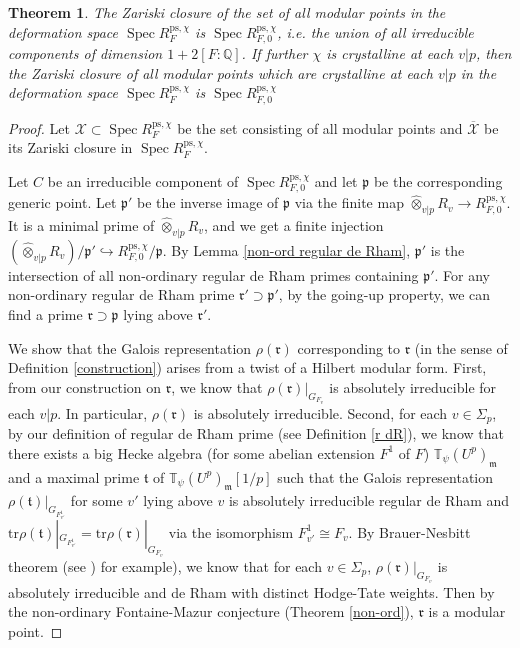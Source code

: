\documentclass[a4paper, 12pt]{amsart}
\newtheorem{thm}{Theorem}[subsection]
\DeclareMathOperator{\Spec}{Spec}
\def\ps{\mathrm{ps}}
\newcommand{\Q}{\mathbb{Q}}
\newcommand{\T}{\mathbb{T}}
\newcommand{\tr}{\mathrm{tr}}
\newcommand{\kp}{\mathfrak{p}}
\newcommand{\km}{\mathfrak{m}}
\begin{document}
    \begin{thm}\label{main thm}
    	The Zariski closure of the set of all modular points in the deformation space $\Spec R_{F}^{\ps, \chi}$ is $\Spec R_{F, 0}^{\ps, \chi}$, i.e. the union of all irreducible components of dimension $1+2[F: \Q]$. If further $\chi$ is crystalline at each $v|p$, then the Zariski closure of all modular points which are crystalline at each $v|p$ in the deformation space $\Spec R_{F}^{\ps, \chi}$ is $\Spec R_{F, 0}^{\ps, \chi}$
    \end{thm}
    
    \begin{proof}
    	Let $\mathcal{X} \subset \Spec R_{F}^{\ps, \chi}$ be the set consisting of all modular points and $\overline{\mathcal{X}}$ be its Zariski closure in $\Spec R_{F}^{\ps, \chi} $.
    	
        Let $C$ be an irreducible component of $\Spec R_{F, 0}^{\ps, \chi}$ and let $\kp$ be the corresponding generic point. Let $\kp'$ be the inverse image of $\kp$ via the finite map $\widehat{\otimes}_{v |p} R_{v} \to R_{F, 0}^{\ps, \chi}$. It is a minimal prime of $\widehat{\otimes}_{v |p} R_{v}$, and we get a finite injection $(\widehat{\otimes}_{v |p} R_{v})/\kp' \hookrightarrow R_{F, 0}^{\ps, \chi}/\kp$. By Lemma \ref{non-ord regular de Rham}, $\kp'$ is the intersection of all non-ordinary regular de Rham primes containing $\kp'$. For any non-ordinary regular de Rham prime $\mathfrak{r}' \supset \kp'$, by the going-up property, we can find a prime
    	$\mathfrak{r} \supset \kp$ lying above $\mathfrak{r}'$.
    	
    	We show that the Galois representation $\rho(\mathfrak{r})$ corresponding to $\mathfrak{r}$ (in the sense of Definition \ref{construction}) arises from a twist of a Hilbert modular form. First, from our construction on $\mathfrak{r}$, we know that $\rho(\mathfrak{r})|_{G_{F_v}}$ is absolutely irreducible for each $v|p$. In particular, $\rho(\mathfrak{r})$ is absolutely irreducible. Second, for each $v \in \Sigma_p$, by our definition of regular de Rham prime (see Definition \ref{r dR}), we know that there exists a big Hecke algebra (for some abelian extension $F^1$ of $F$) $\T_{\psi}(U^p)_\km$ and a maximal prime $\mathfrak{t}$ of $\T_{\psi}(U^p)_\km[1/p]$ such that the Galois representation $\rho(\mathfrak{t})|_{G_{F^1_{v'}}}$ for some $v'$ lying above $v$ is absolutely irreducible regular de Rham and $\tr \rho(\mathfrak{t})|_{G_{F^1_{v'}}} = \tr \rho(\mathfrak{r})|_{G_{F_v}}$ via the isomorphism $F^1_{v'} \cong F_v $. By Brauer-Nesbitt theorem (see \cite[Fact 2.5]{Gee_2022}) for example), we know that for each $v \in \Sigma_p$,  $\rho(\mathfrak{r})|_{G_{F_v}}$ is absolutely irreducible and de Rham with distinct Hodge-Tate weights. Then by the non-ordinary Fontaine-Mazur conjecture (Theorem \ref{non-ord}), $\mathfrak{r}$ is a modular point.
    	

\end{proof}
\end{document}
